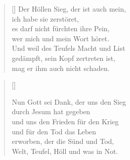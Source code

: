 \begin{multicols}{2}
\begin{verse}[\versewidth]
 Der Höllen Sieg, der ist auch mein,\\
ich habe sie zerstöret,\\
es darf nicht fürchten ihre Pein,\\
wer mich und mein Wort höret.\\
Und weil des Teufels Macht und List\\
gedämpft, sein Kopf zertreten ist,\\
mag er ihm auch nicht schaden.
\end{verse}
\end{multicols}

\begin{center}
\settowidth{\versewidth}{Der, vor dem die Welt erschrickt,}
\begin{verse}[\versewidth]

 Nun Gott sei Dank, der uns den Sieg\\
durch Jesum hat gegeben\\
und uns den Frieden für den Krieg\\
und für den Tod das Leben\\
erworben, der die Sünd und Tod,\\
Welt, Teufel, Höll und was in Not.
   
\end{verse}
\end{center}

